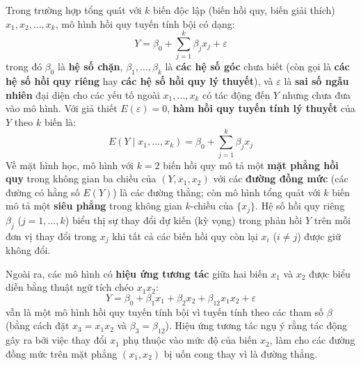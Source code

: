 \documentclass[12pt,a4paper]{report}
\begin{document}
Trong trường hợp tổng quát với $k$ biến độc lập (biến hồi quy, biến giải thích) $x_1, x_2, \dots, x_k$, mô hình hồi quy tuyến tính bội có dạng:
\[
    Y = \beta_0 + \sum_{j=1}^{k} \beta_j x_j + \varepsilon
\]
trong đó $\beta_0$ là \textbf{hệ số chặn}, $\beta_1, \dots, \beta_k$ là \textbf{các hệ số góc} chưa biết (còn gọi là \textbf{các hệ số hồi quy riêng} hay \textbf{các hệ số hồi quy lý thuyết}), và $\varepsilon$ là \textbf{sai số ngẫu nhiên} đại diện cho các yếu tố ngoài $x_1, \dots, x_k$ có tác động đến $Y$ nhưng chưa đưa vào mô hình. Với giả thiết $E(\varepsilon) = 0$, \textbf{hàm hồi quy tuyến tính lý thuyết} của $Y$ theo $k$ biến là:
\[
    E(Y \mid x_1, \dots, x_k) = \beta_0 + \sum_{j=1}^{k} \beta_j x_j
\]
Về mặt hình học, mô hình với $k = 2$ biến hồi quy mô tả một \textbf{mặt phẳng hồi quy} trong không gian ba chiều của $(Y, x_1, x_2)$ với các \textbf{đường đồng mức} (các đường có hằng số $E(Y)$) là các đường thẳng; còn mô hình tổng quát với $k$ biến mô tả một \textbf{siêu phẳng} trong không gian $k$-chiều của $\{x_j\}$. Hệ số hồi quy riêng $\beta_j$ ($j = 1, \dots, k$) biểu thị sự thay đổi dự kiến (kỳ vọng) trong phản hồi $Y$ trên mỗi đơn vị thay đổi trong $x_j$ khi tất cả các biến hồi quy còn lại $x_i$ ($i \ne j$) được giữ không đổi.

Ngoài ra, các mô hình có \textbf{hiệu ứng tương tác} giữa hai biến $x_1$ và $x_2$ được biểu diễn bằng thuật ngữ tích chéo $x_1 x_2$:
\[
    Y = \beta_0 + \beta_1 x_1 + \beta_2 x_2 + \beta_{12} x_1 x_2 + \varepsilon
\]
vẫn là một mô hình hồi quy tuyến tính bội vì tuyến tính theo các tham số $\beta$ (bằng cách đặt $x_3 = x_1 x_2$ và $\beta_3 = \beta_{12}$). Hiệu ứng tương tác ngụ ý rằng tác động gây ra bởi việc thay đổi $x_1$ phụ thuộc vào mức độ của biến $x_2$, làm cho các đường đồng mức trên mặt phẳng $(x_1, x_2)$ bị uốn cong thay vì là đường thẳng.
\end{document}
